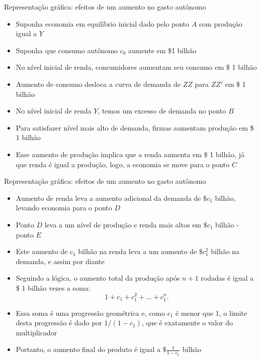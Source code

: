 \documentclass[10pt]{beamer}
\begin{document}
\begin{frame}{Representação gráfica: efeitos de um aumento no gasto autônomo}
    \begin{itemize}
        \item Suponha economia em equilíbrio inicial dado pelo ponto $A$ com produção igual a $Y$\bigskip
         
        \item Suponha que consumo autônomo $c_0$ aumente em \$1 bilhão\bigskip
         
        \item No nível inicial de renda, consumidores aumentam seu consumo em \$ 1 bilhão\bigskip
         
        \item Aumento de consumo desloca a curva de demanda de $ZZ$ para $ZZ'$ em \$ 1 bilhão\bigskip
         
        \item No nível inicial de renda $Y$, temos um excesso de demanda no ponto $B$\bigskip
         
        \item Para satisfazer nível mais alto de demanda, firmas aumentam produção em \$ 1 bilhão\bigskip
         
        \item Esse aumento de produção implica que a renda aumenta em \$ 1 bilhão, já que renda é igual a produção, logo, a economia se move para o ponto $C$
    \end{itemize}
\end{frame}

\begin{frame}{Representação gráfica: efeitos de um aumento no gasto autônomo}
\begin{itemize}
    \item Aumento de renda leva a aumento adicional da demanda de $\$ c_1$ bilhão, levando economia para o ponto $D$\bigskip
     
    \item Ponto $D$ leva a um nível de produção e renda mais altos em $\$c_1$ bilhão - ponto $E$\bigskip
     
    \item Este aumento de $c_1$ bilhão na renda leva a um aumento de $\$c_1^2$ bilhão na demanda, e assim por diante\bigskip
     
    \item Seguindo a lógica, o aumento total da produção após $n+1$ rodadas é igual a \$ 1 bilhão vezes a soma:
    \[
    1 + c_1 + c_1^2 + \dots + c_1^n.
    \]
     
    \item Essa soma é uma progressão geométrica e, como $c_1$ é menor que 1, o limite desta progressão é dado por $1/(1-c_1)$, que é exatamente o valor do multiplicador\bigskip
     
    \item Portanto, o aumento final do produto é igual a $\$\frac{1}{1-c_1}$ bilhão
\end{itemize}
\end{frame}
\end{document}
